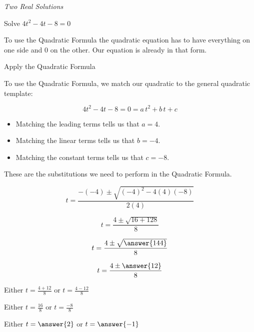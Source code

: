 \documentclass{ximera}
\begin{document}
\begin{example} \textit{Two Real Solutions} 

Solve $4 t^2 - 4 t - 8 = 0$ \\



\begin{explanation}

To use the Quadratic Formula the quadratic equation has to have everything on one side and $0$ on the other.  Our equation is already in that form.

Apply the Quadratic Formula



\begin{procedure}
To use the Quadratic Formula, we match our quadratic to the general quadratic template:

\[
4 t^2 - 4 t - 8 = 0 = a \, t^2 + b \, t + c
\]


\begin{itemize}
\item Matching the leading terms tells us that $a = 4$.
\item Matching the linear terms tells us that $b = -4$.
\item Matching the constant terms tells us that $c = -8$.
\end{itemize}

These are the substitutions we need to perform in the Quadratic Formula.

\end{procedure}
















\[   t = \frac{-(-4) \pm \sqrt{(-4)^2 - 4 (4) (-8)}}{2 (4)}            \]

\[   t = \frac{4 \pm \sqrt{16 + 128}}{8}            \]

\[   t = \frac{4 \pm \sqrt{\answer{144}}}{8}            \]

\[   t = \frac{4 \pm \answer{12}}{8}            \]




Either $t = \frac{4 + 12}{8} $ or $t = \frac{4 - 12}{8} $

Either $t = \frac{16}{8} $ or $t = \frac{-8}{8} $

Either $t = \answer{2}$ or $t = \answer{-1}$

\end{explanation}

\end{example}
\end{document}
